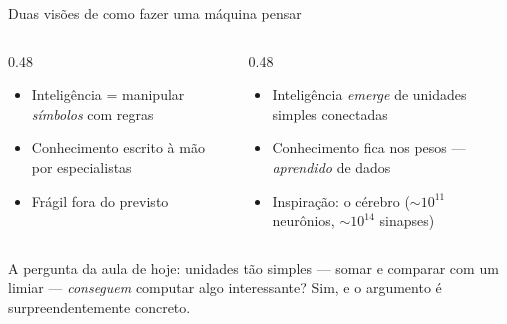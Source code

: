 \documentclass[aspectratio=169, 11pt]{beamer}
\begin{document}
\begin{frame}{Duas visões de como fazer uma máquina pensar}
  \begin{columns}[T]
    \begin{column}{0.48\textwidth}
      \begin{tcolorbox}[iccaixa=icCinza, title={IA simbólica}]
        \begin{itemize}\setlength{\itemsep}{0.2ex}
          \item Inteligência = manipular \emph{símbolos} com regras
          \item Conhecimento escrito à mão por especialistas
          \item Frágil fora do previsto
        \end{itemize}
      \end{tcolorbox}
    \end{column}
    \begin{column}{0.48\textwidth}
      \begin{tcolorbox}[iccaixa=icNeural, title={Conexionismo}]
        \begin{itemize}\setlength{\itemsep}{0.2ex}
          \item Inteligência \emph{emerge} de unidades simples conectadas
          \item Conhecimento fica nos \alert{pesos} — \emph{aprendido}
                de dados
          \item Inspiração: o cérebro ($\sim 10^{11}$ neurônios,
                $\sim 10^{14}$ sinapses)
        \end{itemize}
      \end{tcolorbox}
    \end{column}
  \end{columns}

  \vspace{-0.25em}
  \begin{ideiabox}
    A pergunta da aula de hoje: unidades tão simples — somar e comparar com
    um limiar — \emph{conseguem} computar algo interessante? Sim, e o
    argumento é surpreendentemente concreto.
  \end{ideiabox}
\end{frame}
\end{document}
